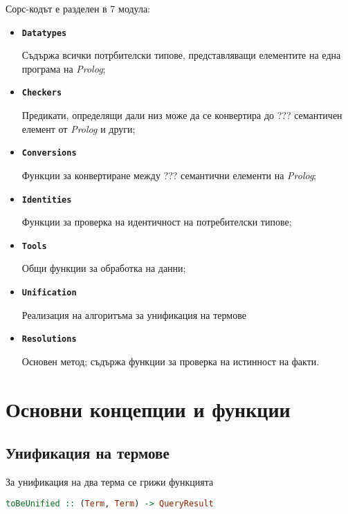 \documentclass[15pt]{extarticle}
\begin{document}
	Сорс-кодът е разделен в 7 модула:
	\begin{itemize}
		\item \textbf{\texttt{Datatypes}}
		
		Съдържа всички потрбителски типове, представляващи елементите на една програма на \emph{Prolog};
		
		\item \textbf{\texttt{Checkers}}
		
		Предикати, определящи дали низ може да се конвертира до ??? семантичен елемент от \emph{Prolog} и други;
		
		\item \textbf{\texttt{Conversions}}
		
		Функции за конвертиране между ??? семантични елементи на \emph{Prolog};
		
		\item \textbf{\texttt{Identities}}
		
		Функции за проверка на идентичност на потребителски типове;
		
		\item \textbf{\texttt{Tools}}
		
		Общи функции за обработка на данни;
		
		\item \textbf{\texttt{Unification}}
		
		Реализация на алгоритъма за унификация на термове
		
		\item \textbf{\texttt{Resolutions}}
		
		Основен метод; съдържа функции за проверка на истинност на факти.
		
	\end{itemize}
	
	\section{Основни концепции и функции}
	
	
	
	\subsection{Унификация на термове}
	
	За унификация на два терма се грижи функцията
	
	\begin{lstlisting}[language=haskell]
		toBeUnified :: (Term, Term) -> QueryResult
	\end{lstlisting}
	
\end{document}
